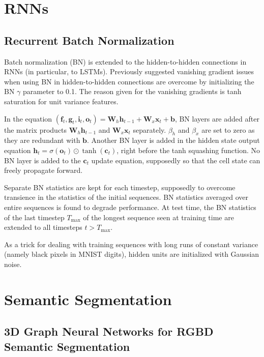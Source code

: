 \documentclass[a4paper, 12pt]{article}
\begin{document}
\section{RNNs}

\subsection{Recurrent Batch
            Normalization~\citet{DBLP:journals/corr/CooijmansBLC16}}

Batch normalization (BN) is extended to the hidden-to-hidden connections in
RNNs (in particular, to LSTMs). Previously suggested vanishing gradient issues
when using BN in hidden-to-hidden connections are overcome by initializing the
BN $\gamma$ parameter to 0.1. The reason given for the vanishing gradients is
tanh saturation for unit variance features.

In the equation
$(\mathbf{f}_t, \mathbf{g}_t, \mathbf{i}_t, \mathbf{o}_t) =
\mathbf{W}_h \mathbf{h}_{t - 1} + \mathbf{W}_x \mathbf{x}_t + \mathbf{b}$,
BN layers are added after the matrix products
$\mathbf{W}_h \mathbf{h}_{t - 1}$ and $\mathbf{W}_x \mathbf{x}_t$ separately.
$\beta_h$ and $\beta_x$ are set to zero as they are redundant with
$\mathbf{b}$. Another BN layer is added in the hidden state output equation
$\mathbf{h}_t = \sigma{(\mathbf{o}_t)} \odot \tanh{(\mathbf{c}_t)}$,
right before the tanh squashing function. No BN layer is added to the
$\mathbf{c}_t$ update equation, supposedly so that the cell state can freely
propagate forward.

Separate BN statistics are kept for each timestep, supposedly to overcome
transience in the statistics of the initial sequences. BN statistics averaged
over entire sequences is found to degrade performance. At test time, the BN
statistics of the last timestep $T_{\max}$ of the longest sequence seen at
training time are extended to all timesteps $t > T_{\max}$.

As a trick for dealing with training sequences with long runs of constant
variance (namely black pixels in MNIST digits), hidden units are initialized
with Gaussian noise.


\section{Semantic Segmentation}

\subsection{3D Graph Neural Networks for RGBD Semantic
            Segmentation~\cite{qi20173d}}
\end{document}

